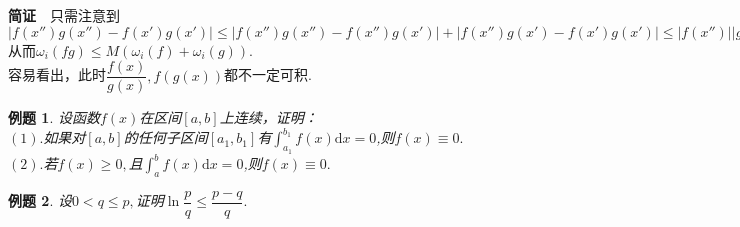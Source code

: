 \documentclass[UTF8]{article}
\newcommand{\dx}{\mathrm{d}x}
\newcommand{\jz}{\textbf{简证}$\quad$}
\newtheorem{exa}{\hspace{2em}例题}[section]
\begin{document}
\jz 只需注意到$|f(x'')g(x'')-f(x')g(x')|\le|f(x'')g(x'')-f(x'')g(x')|+|f(x'')g(x')-f(x')g(x')|\le|f(x'')||g(x'')-g(x')|+
|g(x')||f(x'')-f(x')|,$从而$\omega_i(fg)\le M(\omega_i(f)+\omega_i(g)).$\\
容易看出，此时$\dfrac{f(x)}{g(x)},f(g(x))$都不一定可积.
\begin{exa}
  设函数$f(x)$在区间$[a,b]$上连续，证明：\\
  $(1).$如果对$[a,b]$的任何子区间$[a_1,b_1]$有$\displaystyle\int_{a_1}^{b_1}f(x)\dx=0$,则$f(x)\equiv0.$\\
  $(2).$若$f(x)\ge0,$且$\displaystyle\int_a^bf(x)\dx=0$,则$f(x)\equiv0.$
\end{exa}
\begin{exa}
  设$0<q\le p,$证明$\ln\dfrac{p}{q}\le\dfrac{p-q}{q}.$
\end{exa}
\clearpage
\end{document}
